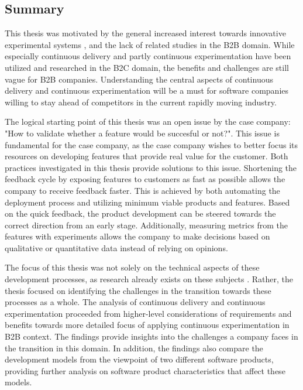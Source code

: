 \documentclass[english]{tktltiki2}
\theoremstyle{definition}
\theoremstyle{remark}
\begin{document}
\subsection{Summary}
This thesis was motivated by the general increased interest towards innovative experimental systems \cite{olsson2012climbing}, and the lack of related studies in the B2B domain. While especially continuous delivery and partly continuous experimentation have been utilized and researched in the B2C domain, the benefits and challenges are still vague for B2B companies. Understanding the central aspects of continuous delivery and continuous experimentation will be a must for software companies willing to stay ahead of competitors in the current rapidly moving industry.

The logical starting point of this thesis was an open issue by the case company: "How to validate whether a feature would be succesful or not?". This issue is fundamental for the case company, as  the case company wishes to better focus its resources on developing features that provide real value for the customer. Both practices investigated in this thesis provide solutions to this issue. Shortening the feedback cycle by exposing features to customers as fast as possible allows the company to receive feedback faster. This is achieved by both automating the deployment process and utilizing minimum viable products and features. Based on the quick feedback, the product development can be steered towards the correct direction from an early stage. Additionally, measuring metrics from the features with experiments allows the company to make decisions based on qualitative or quantitative data instead of relying on opinions.
%

The focus of this thesis was not solely on the technical aspects of these development processes, as research already exists on these subjects \cite{kohavi2007practical, eklund2012architecture, cdbook}. Rather, the thesis focused on identifying the challenges in the transition towards these processes as a whole. The analysis of continuous delivery and continuous experimentation proceeded from higher-level considerations of requirements and benefits towards more detailed focus of applying continuous experimentation in B2B context. The findings provide insights into the challenges a company faces in the transition in this domain. In addition, the findings also compare the development models from the viewpoint of two different software products, providing further analysis on software product characteristics that affect these models.
\end{document}

